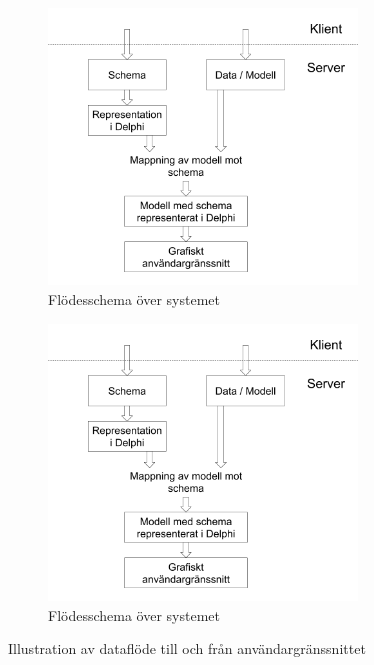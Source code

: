 \begin{figure}
	\begin{subfigure}[b]{0.5\textwidth}
		\includegraphics[width=0.9\textwidth,left]{./img.png}
		\caption{Flödesschema över systemet}
		\label{fig:system:ner}
	\end{subfigure}
	\begin{subfigure}[b]{0.5\textwidth}
		\includegraphics[width=0.9\textwidth,right]{./img.png}
		\caption{Flödesschema över systemet}
		\label{fig:system:upp}	
	\end{subfigure}
	\caption{Illustration av dataflöde till och från användargränssnittet}
	\label{fig:system}
\end{figure}

